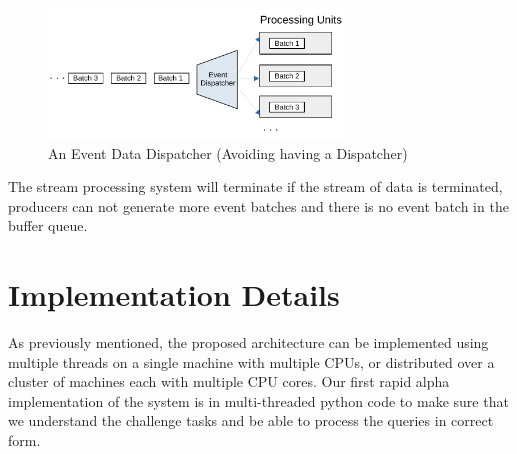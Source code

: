 \begin{figure}[]
    \begin{center}
        \includegraphics[width=0.7\textwidth]{./images/Stream-Batch-Distributions}
        \caption{An Event Data Dispatcher (Avoiding having a Dispatcher)}
        \label{fig:batch-distributions}
    \end{center}
\end{figure}




The stream processing system will terminate if the stream of data is terminated, producers can not generate more event batches 
and there is no event batch in the buffer queue. 





\section{Implementation Details}\label{sec:implementation}
As previously mentioned, the proposed architecture can be implemented using multiple threads on a single machine with multiple CPUs, or distributed over a 
cluster of machines each with multiple CPU cores. Our first rapid alpha implementation of the system is in multi-threaded python code to make sure
that we understand the challenge tasks and be able to process the queries in correct form.  






